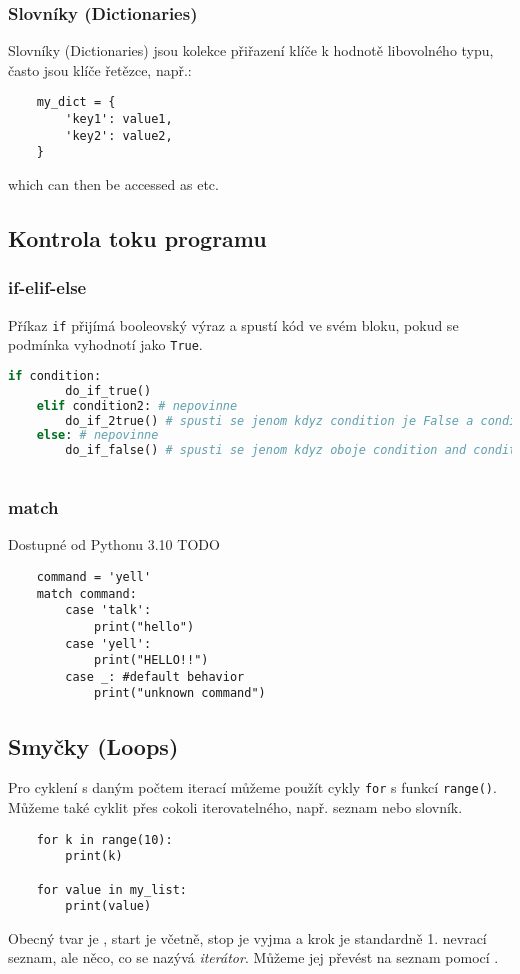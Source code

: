 \subsubsection{Slovníky (Dictionaries)}
Slovníky (Dictionaries) jsou kolekce přiřazení klíče k hodnotě libovolného typu, často jsou klíče řetězce, např.:
\begin{lstlisting}
    my_dict = {
        'key1': value1,
        'key2': value2,
    }
\end{lstlisting}
which can then be accessed as  etc.

\subsection{Kontrola toku programu}

\subsubsection{if-elif-else}
Příkaz \verb|if| přijímá booleovský výraz a spustí kód ve svém bloku, pokud se podmínka vyhodnotí jako \verb|True|.
\begin{lstlisting}[language=Python]
    if condition:
        do_if_true()
    elif condition2: # nepovinne
        do_if_2true() # spusti se jenom kdyz condition je False a condition2 je True
    else: # nepovinne
        do_if_false() # spusti se jenom kdyz oboje condition and condition2 jsou False
        
\end{lstlisting}

\subsubsection{match}
Dostupné od Pythonu 3.10
TODO
\begin{lstlisting}
    command = 'yell'
    match command:
        case 'talk':
            print("hello")
        case 'yell':
            print("HELLO!!")
        case _: #default behavior
            print("unknown command")
\end{lstlisting}

\subsection{Smyčky (Loops)}
Pro cyklení s daným počtem iterací můžeme použít cykly \verb|for| s funkcí \verb|range()|. Můžeme také cyklit přes cokoli iterovatelného, např. seznam nebo slovník.
\begin{lstlisting}
    for k in range(10):
        print(k)

    for value in my_list:
        print(value) 
\end{lstlisting}
Obecný tvar  je , start je včetně, stop je vyjma a krok je standardně 1.  nevrací seznam, ale něco, co se nazývá \emph{iterátor}. Můžeme jej převést na seznam pomocí .


